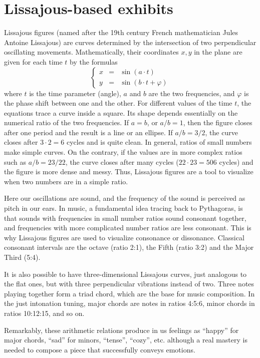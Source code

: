 \section{Lissajous-based exhibits}
Lissajous figures (named after the 19th century French mathematician Jules Antoine Lissajous) are curves determined by the intersection of two perpendicular oscillating movements. Mathematically, their coordinates $x,y$ in the plane are given for each time $t$ by the formulas
$$\left\{ \begin{array}{rcl}
x &=& \sin(a\cdot t) \\
y &=& \sin(b\cdot t + \varphi)
\end{array} \right. $$
where $t$ is the time parameter (angle),  $a$ and $b$ are the two frequencies, and $\varphi$ is the phase shift between one and the other. For different values of the time $t$, the equations trace a curve inside a square. Its shape depends essentially on the numerical ratio of the two frequencies. If $a=b$, or $a/b=1$, then the figure closes after one period and the result is a line or an ellipse. If $a/b = 3/2$, the curve closes after $3\cdot 2=6$ cycles and is quite clean. In general, ratios of small numbers make simple curves. On the contrary, if the values are in more complex ratios such as $a/b = 23/22$, the curve closes after many cycles ($22\cdot 23=506$ cycles) and the figure is more dense and messy. Thus, Lissajous figures are a tool to visualize when two numbers are in a simple ratio.

Here our oscillations are sound, and the frequency of the sound is perceived as pitch in our ears. In music, a fundamental idea tracing back to Pythagoras, is that sounds with frequencies in small number ratios sound consonant together, and frequencies with more complicated number ratios are less consonant. This is why Lissajous figures are used to visualize consonance or dissonance. Classical consonant intervals are the octave (ratio 2:1), the Fifth (ratio 3:2) and the Major Third (5:4).

It is also possible to have three-dimensional Lissajous curves, just analogous to the flat ones, but with three perpendicular vibrations instead of two. Three notes playing together form a triad chord, which are the base for music composition. In the just intonation tuning, major chords are notes in ratios 4:5:6, minor chords in ratios 10:12:15, and so on.

Remarkably, these arithmetic relations produce in us feelings as ``happy'' for major chords, ``sad'' for minors, 
``tense'', ``cozy'', etc. although a real mastery is needed to compose a piece that successfully conveys emotions.

